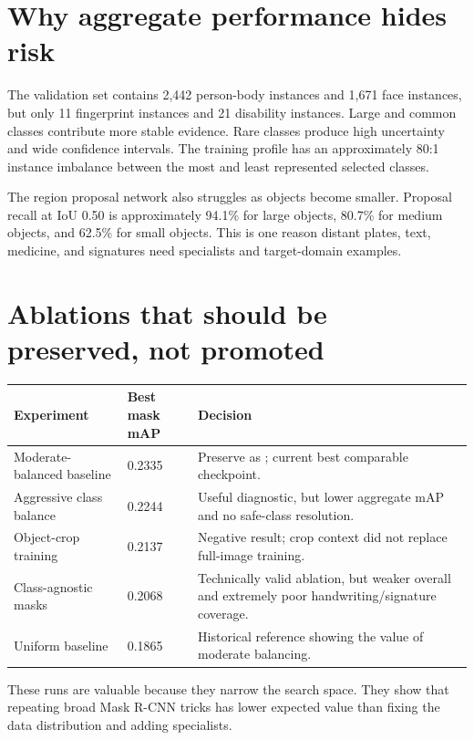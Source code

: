 \section{Why aggregate performance hides risk}

The validation set contains 2,442 person-body instances and 1,671 face instances, but only 11 fingerprint instances and 21 disability instances. Large and common classes contribute more stable evidence. Rare classes produce high uncertainty and wide confidence intervals. The training profile has an approximately 80:1 instance imbalance between the most and least represented selected classes.

The region proposal network also struggles as objects become smaller. Proposal recall at IoU 0.50 is approximately 94.1\% for large objects, 80.7\% for medium objects, and 62.5\% for small objects. This is one reason distant plates, text, medicine, and signatures need specialists and target-domain examples.

\section{Ablations that should be preserved, not promoted}

\begin{tabularx}{\textwidth}{@{}L{43mm}L{24mm}Y@{}}
\toprule
\textbf{Experiment} & \textbf{Best mask mAP} & \textbf{Decision} \\
\midrule
Moderate-balanced baseline & 0.2335 & Preserve as ; current best comparable checkpoint. \\
Aggressive class balance & 0.2244 & Useful diagnostic, but lower aggregate mAP and no safe-class resolution. \\
Object-crop training & 0.2137 & Negative result; crop context did not replace full-image training. \\
Class-agnostic masks & 0.2068 & Technically valid ablation, but weaker overall and extremely poor handwriting/signature coverage. \\
Uniform baseline & 0.1865 & Historical reference showing the value of moderate balancing. \\
\bottomrule
\end{tabularx}

These runs are valuable because they narrow the search space. They show that repeating broad Mask R-CNN tricks has lower expected value than fixing the data distribution and adding specialists.

